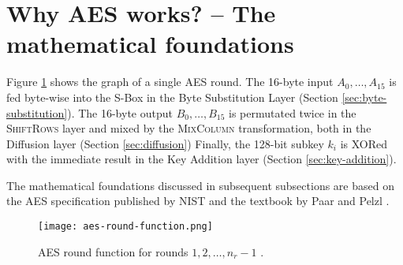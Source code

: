 \section{Why AES works? -- The mathematical foundations}
\label{sec:why}
\label{sec:math}

Figure \ref{fig:aes-round-function} shows the graph of a single AES round. 
The 16-byte input $A_0, \dots, A_{15}$ is fed byte-wise into the S-Box in the Byte Substitution Layer (Section \ref{sec:byte-substitution}).
The 16-byte output $B_0, \dots, B_{15}$ is permutated twice in the \textsc{ShiftRows} layer and mixed by the \textsc{MixColumn} transformation, both in the Diffusion layer (Section \ref{sec:diffusion})
Finally, the 128-bit subkey $k_i$ is XORed with the immediate result in the Key Addition layer (Section \ref{sec:key-addition}).

The mathematical foundations discussed in subsequent subsections are based on the \gls{AES} specification published by \gls{NIST} \cite{NIST_AES} and the textbook by Paar and Pelzl \cite{Paar2024}.

\begin{figure}[!ht]
    \centering
    \texttt{[image: aes-round-function.png]}
    \caption{
        AES round function for rounds $1, 2, \dots, n_r-1$ \cite{Paar2024}.
    }
    \label{fig:aes-round-function}
\end{figure}









\newpage

